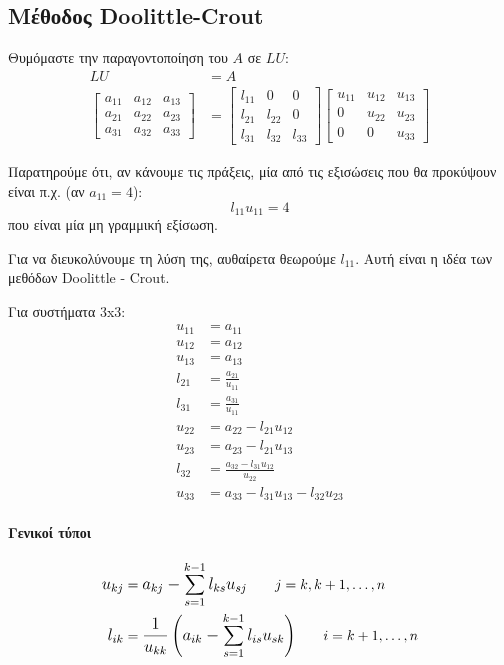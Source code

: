 \documentclass[11pt,a4paper,notitlepage,fleqn]{article}
\begin{document}
\subsection{Μέθοδος Doolittle-Crout}
Θυμόμαστε την παραγοντοποίηση του \( A \) σε \( LU \):
\begin{align*}
	LU &= A \\
	\left[\begin{matrix}
	a_{11} & a_{12} & a_{13} \\
	a_{21} & a_{22} & a_{23} \\
	a_{31} & a_{32} & a_{33}
	\end{matrix}\right] &= \left[\begin{matrix}
	l_{11} & 0 & 0 \\
	l_{21} & l_{22} & 0 \\
	l_{31} & l_{32} & l_{33}
	\end{matrix}\right]\left[\begin{matrix}
	u_{11} & u_{12} & u_{13} \\
	0 & u_{22} & u_{23} \\
	0 & 0 & u_{33}
	\end{matrix}\right]
\end{align*}

	Παρατηρούμε ότι, αν κάνουμε τις πράξεις, μία από τις εξισώσεις
που θα προκύψουν είναι π.χ. (αν \( a_{11} = 4 \)):
\[
l_{11}u_{11} = 4
\]
που είναι μία μη γραμμική εξίσωση.

Για να διευκολύνουμε τη λύση της, αυθαίρετα θεωρούμε \( l_{11} \).
Αυτή είναι η ιδέα των μεθόδων Doolittle - Crout.

Για συστήματα 3x3:
\begin{align*}
	u_{11} &= a_{11} \\
	u_{12} &= a_{12} \\
	u_{13} &= a_{13} \\[3ex]
	l_{21} &= \frac{a_{21}}{u_{11}} \\
	l_{31} &= \frac{a_{31}}{u_{11}} \\[3ex]
	u_{22} &= a_{22} - l_{21}u_{12} \\
	u_{23} &= a_{23} - l_{21}u_{13} \\[3ex]
	l_{32} &= \frac{a_{32}-l_{31}u_{12}}{u_{22}} \\
	u_{33} &= a_{33} - l_{31}u_{13} - l_{32}u_{23}
\end{align*}

\paragraph{Γενικοί τύποι}
\begin{align*}
	\mathlarger{u_{kj}} &=
	\mathlarger{a_{kj}-\sum_{s=1}^{k-1} l_{ks}u_{sj} }
	\qquad j=k,k+1,\dots,n \\
	\mathlarger{l_{ik}} &=
	\mathlarger{
	\frac{1}{u_{kk}} \left(a_{ik}-\sum_{s=1}^{k-1}
	l_{is}u_{sk}\right)
    }\qquad i=k+1,\dots,n
\end{align*}
\end{document}
